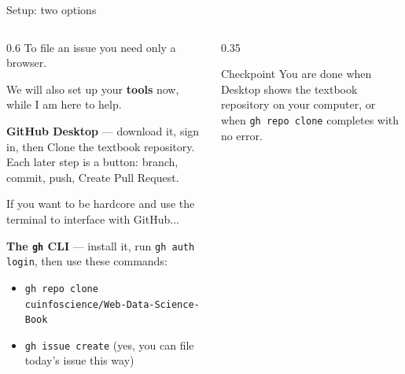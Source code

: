 \documentclass[9pt,aspectratio=169]{beamer}
\begin{document}
\begin{frame}{Setup: two options}
    \begin{columns}[T]
        \begin{column}{0.6\textwidth}
            To file an issue you need only a browser.

            \medskip

            We will also set up your \textbf{tools} now, while I am here to help.

            \smallskip

            \textbf{GitHub Desktop} --- download it, sign in, then Clone the textbook repository. Each later step is a button: branch, commit, push, Create Pull Request.

            \bigskip

            If you want to be hardcore and use the terminal to interface with GitHub...

            \textbf{The \texttt{gh} CLI} --- install it, run \texttt{gh auth login}, then use these commands:
            {\footnotesize
            \begin{itemize}\footnotesize
                \item \texttt{gh repo clone cuinfoscience/Web-Data-Science-Book}
                \item \texttt{gh issue create} \quad(yes, you can file today's issue this way)
            \end{itemize}}
        \end{column}
        \begin{column}{0.35\textwidth}
            \begin{alertblock}{Checkpoint}
                \footnotesize You are done when Desktop shows the textbook repository on your computer, or when \texttt{gh repo clone} completes with no error.
            \end{alertblock}
        \end{column}
    \end{columns}
\end{frame}
\end{document}
